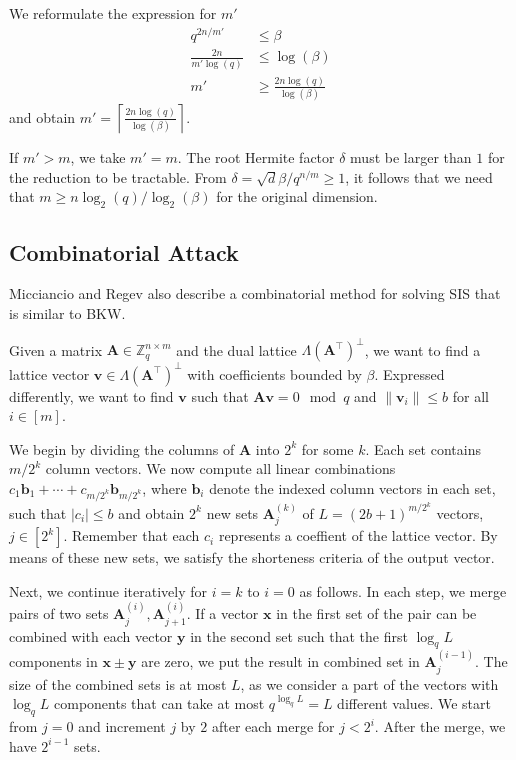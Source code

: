 We reformulate the expression for $m'$
\begin{align}
  q^{2n / m'}           & \leq \beta                          \nonumber       \\
  \frac{2n}{m' \log(q)} & \leq \log(\beta)                          \nonumber \\
  m'                    & \geq \frac{2n \log(q)}{\log(\beta)}
\end{align}
and obtain $m' = \left\lceil \frac{2n \log(q)}{\log(\beta)} \right\rceil$.

If $m' > m$, we take $m' = m$. The root Hermite factor $\delta$ must be larger than $1$ for the reduction to be tractable. From $\delta = \sqrt{d}{\beta / q^{n/m}} \geq 1$, it follows that we need that $m \geq n \log_2(q) / \log_2(\beta)$ for the original dimension.



\subsection[Combinatorial Attack]{Combinatorial Attack \cite{MR09}}\label{sec:combinatorial}
Micciancio and Regev also describe a combinatorial method for solving SIS \cite{MR09} that is similar to BKW.

Given a matrix $\mathbf{A} \in \mathbb{Z}_q^{n \times m}$ and the dual lattice $\Lambda(\mathbf{A}^\intercal)^{\perp}$, we want to find a lattice vector $\mathbf{v} \in \Lambda(\mathbf{A}^\intercal)^{\perp}$ with coefficients bounded by $\beta$. Expressed differently, we want to find $\mathbf{v}$ such that $\mathbf{A}\mathbf{v} = 0 \mod q$ and $\|\mathbf{v}_i\| \leq b$ for all $i \in [m]$.

We begin by dividing the columns of $\mathbf{A}$ into $2^k$ for some $k$. Each set contains $m/2^k$ column vectors. We now compute all linear combinations $c_1 \mathbf{b}_1 + \cdots + c_{m/2^k}\mathbf{b}_{m/2^k}$, where $\mathbf{b}_i$ denote the indexed column vectors in each set, such that $|c_i| \leq b$ and obtain $2^k$ new sets $\mathbf{A}_j^{(k)}$ of $L=(2b+1)^{m/2^k}$ vectors, $j\in \left[2^k\right]$. Remember that each $c_i$ represents a coeffient of the lattice vector. By means of these new sets, we satisfy the shorteness criteria of the output vector.

Next, we continue iteratively for $i=k$ to $i=0$ as follows. In each step, we merge pairs of two sets $\mathbf{A}_j^{(i)}, \mathbf{A}_{j+1}^{(i)}$. If a vector $\mathbf{x}$ in the first set of the pair can be combined with each vector $\mathbf{y}$ in the second set such that the first $\log_q L$ components in $\mathbf{x} \pm \mathbf{y}$ are zero, we put the result in combined set in $\mathbf{A}_j^{(i-1)}$. The size of the combined sets is at most $L$, as we consider a part of the vectors with $\log_q L$ components that can take at most $q^{\log_q L} = L$ different values. We start from $j=0$ and increment $j$ by $2$ after each merge for $j<2^i$.
After the merge, we have $2^{i-1}$ sets.

